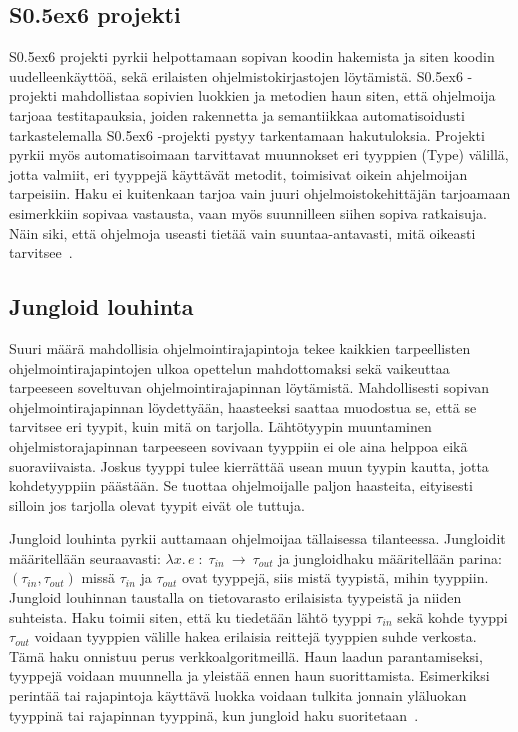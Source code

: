 \documentclass[finnish]{../tktltiki2}
\theoremstyle{definition}
\theoremstyle{remark}
\begin{document}
\subsection{S\raise0.5ex\hbox{6} projekti}
S\raise0.5ex\hbox{6} projekti pyrkii helpottamaan sopivan koodin hakemista ja siten koodin uudelleenkäyttöä, sekä erilaisten ohjelmistokirjastojen löytämistä. S\raise0.5ex\hbox{6} -projekti mahdollistaa sopivien luokkien ja metodien haun siten, että ohjelmoija tarjoaa testitapauksia, joiden rakennetta ja semantiikkaa automatisoidusti tarkastelemalla S\raise0.5ex\hbox{6} -projekti pystyy tarkentamaan hakutuloksia. Projekti pyrkii myös automatisoimaan tarvittavat muunnokset eri tyyppien (Type) välillä, jotta valmiit, eri tyyppejä käyttävät metodit, toimisivat oikein ahjelmoijan tarpeisiin. Haku ei kuitenkaan tarjoa vain juuri ohjelmoistokehittäjän tarjoamaan esimerkkiin sopivaa vastausta, vaan myös suunnilleen siihen sopiva ratkaisuja. Näin siki, että ohjelmoja useasti tietää vain suuntaa-antavasti, mitä oikeasti tarvitsee~\cite{what-to-search-for}.

\subsection{Jungloid louhinta}
Suuri määrä mahdollisia ohjelmointirajapintoja tekee kaikkien tarpeellisten ohjelmointirajapintojen ulkoa opettelun mahdottomaksi sekä vaikeuttaa tarpeeseen soveltuvan ohjelmointirajapinnan löytämistä. Mahdollisesti sopivan ohjelmointirajapinnan löydettyään, haasteeksi saattaa muodostua se, että se tarvitsee eri tyypit, kuin mitä on tarjolla. Lähtötyypin muuntaminen ohjelmistorajapinnan tarpeeseen sovivaan tyyppiin ei ole aina helppoa eikä suoraviivaista. Joskus tyyppi tulee kierrättää usean muun tyypin kautta, jotta kohdetyyppiin päästään. Se tuottaa ohjelmoijalle paljon haasteita, eityisesti silloin jos tarjolla olevat tyypit eivät ole tuttuja.

Jungloid louhinta pyrkii auttamaan ohjelmoijaa tällaisessa tilanteessa.
Jungloidit määritellään seuraavasti: $ \lambda x.\, e\; :\; \tau_{in}\:\to\:\tau_{out}$ ja jungloidhaku määritellään parina: $(\tau_{in}, \tau_{out})$ missä $\tau_{in}$ ja $\tau_{out}$ ovat tyyppejä, siis mistä tyypistä, mihin tyyppiin. Jungloid louhinnan taustalla on tietovarasto erilaisista tyypeistä ja niiden suhteista. Haku toimii siten, että ku tiedetään lähtö tyyppi $\tau_{in}$ sekä kohde tyyppi $\tau_{out}$ voidaan tyyppien välille hakea erilaisia reittejä tyyppien suhde verkosta. Tämä haku onnistuu perus verkkoalgoritmeillä. Haun laadun parantamiseksi, tyyppejä voidaan muunnella ja yleistää ennen haun suorittamista. Esimerkiksi perintää tai rajapintoja käyttävä luokka voidaan tulkita jonnain yläluokan tyyppinä tai rajapinnan tyyppinä, kun jungloid haku suoritetaan~\cite{jungloid-mining}.
\end{document}
